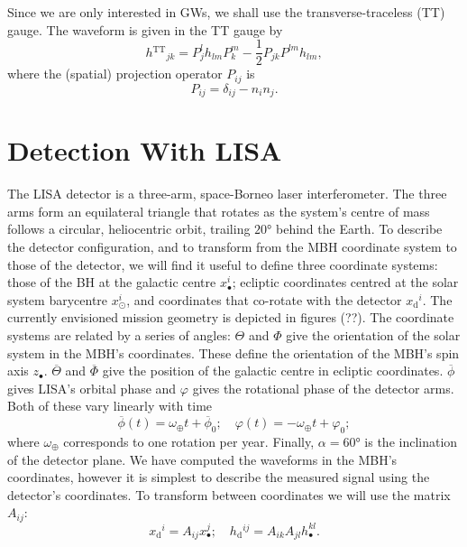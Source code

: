 \documentclass[a4paper, 11pt, titlepage, twoside]{report}
\newcommand{\sub}[1]{\ensuremath{_\mathrm{#1}}}
\newcommand{\super}[1]{\ensuremath{^\mathrm{#1}}}
\newcommand{\recip}[1]{\ensuremath{\frac{1}{#1}}}
\begin{document}
Since we are only interested in GWs, we shall use the transverse-traceless (TT) gauge. The waveform is given in the TT gauge by\cite{Misner1973}
\begin{equation}
{h\super{TT}}_{jk} = P^l_jh_{lm}P^m_k - \recip{2}P_{jk}P^{lm}h_{lm},
\end{equation}
where the (spatial) projection operator $P_{ij}$ is
\begin{equation}
P_{ij} = \delta_{ij} - n_in_j.
\end{equation}

\section{Detection With LISA}

The LISA detector is a three-arm, space-Borneo laser interferometer\cite{Bender1998, Danzmann2003}. The three arms form an equilateral triangle that rotates as the system's centre of mass follows a circular, heliocentric orbit, trailing $\ang{20}$ behind the Earth. To describe the detector configuration, and to transform from the MBH coordinate system to those of the detector, we will find it useful to define three coordinate systems: those of the BH at the galactic centre $x_\bullet^i$; ecliptic coordinates centred at the solar system barycentre $x_\odot^i$, and coordinates that co-rotate with the detector $x\sub{d}^i$. The currently envisioned mission geometry is depicted in figures (??). The coordinate systems are related by a series of angles: $\Theta$ and $\Phi$ give the orientation of the solar system in the MBH's coordinates. These define the orientation of the MBH's spin axis $z_\bullet$. $\overline{\Theta}$ and $\overline{\Phi}$ give the position of the galactic centre in ecliptic coordinates. $\overline{\phi}$ gives LISA's orbital phase and $\varphi$ gives the rotational phase of the detector arms. Both of these vary linearly with time
\begin{equation}
\overline{\phi}(t) = \omega_\oplus t + \overline{\phi}_0; \quad \varphi(t) = -\omega_\oplus t + \varphi_0;
\end{equation}
where $\omega_\oplus$ corresponds to one rotation per year. Finally, $\alpha = \ang{60}$ is the inclination of the detector plane. We have computed the waveforms in the MBH's coordinates, however it is simplest to describe the measured signal using the detector's coordinates. To transform between coordinates we will use the matrix $A_{ij}$:
\begin{equation}
x\sub{d}^i = A_{ij}x_\bullet^j; \quad h\sub{d}^{ij} = A_{ik}A_{jl}h_\bullet^{kl}.
\end{equation}
\end{document}
